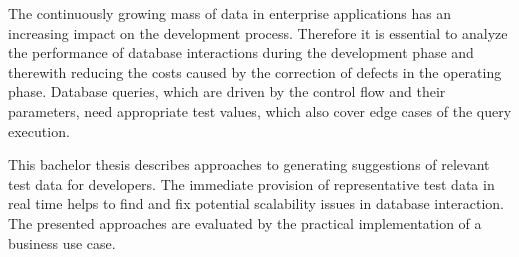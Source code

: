 {
The continuously growing mass of data in enterprise applications has an increasing impact on the development process.
Therefore it is essential to analyze the performance of database interactions during the development phase and therewith reducing the costs caused by the correction of defects in the operating phase.
Database queries, which are driven by the control flow and their parameters, need appropriate test values, which also cover edge cases of the query execution.

This bachelor thesis describes approaches to generating suggestions of relevant test data for developers.
The immediate provision of representative test data in real time helps to find and fix potential scalability issues in database interaction.
The presented approaches are evaluated by the practical implementation of a business use case.

}
